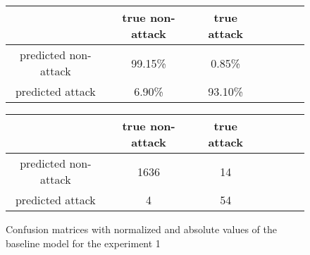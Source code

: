 \documentclass{article}
\begin{document}
\begin{figure}[h!]
    \centering
    \begin{tabular}{ |c|c|c|c|c|c|c| }
     \hline
      & true non-attack & true attack \\
     \hline
     predicted non-attack & 99.15\% & 0.85\% \\
     \hline
     predicted attack & 6.90\% & 93.10\% \\
     \hline
    \end{tabular}

    \vspace{0.2cm}

    \centering
    \begin{tabular}{ |c|c|c|c|c|c|c| }
     \hline
      & true non-attack & true attack \\
     \hline
     predicted non-attack & 1636 & 14 \\
     \hline
     predicted attack & 4 & 54 \\
     \hline
    \end{tabular}
    \caption{Confusion matrices with normalized and absolute values of the baseline model for the experiment 1}
    \label{fig-exp1-baseline}
\end{figure}


\end{document}
